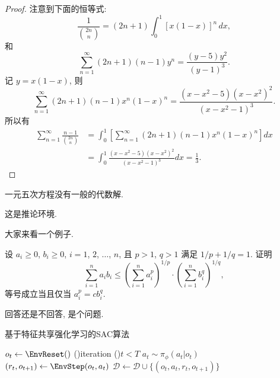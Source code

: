 \begin{proof}
注意到下面的恒等式:
\[
\frac{1}{\binom{2n}{n}}=(2n+1)\int_0^1[x(1-x)]^n\,dx,
\]
和
\[
\sum_{n=1}^{\infty}(2n+1)(n-1)y^n=\frac{(y-5)y^2}{(y-1)^3}.
\]
记 $y=x(1-x)$, 则
\[
\sum_{n=1}^{\infty}(2n+1)(n-1)x^n(1-x)^n=\frac{(x-x^2-5)(x-x^2)^2}{(x-x^2-1)^3}.
\]
所以有
\begin{align*}
\sum_{n=1}^{\infty}\frac{n-1}{\binom{2n}{n}} & =
\int_0^1\left[\sum_{n=1}^{\infty}(2n+1)(n-1)x^n(1-x)^n\right]dx\\
& =\int_0^1\frac{(x-x^2-5)(x-x^2)^2}{(x-x^2-1)^3}dx=\frac13.
\end{align*}
\end{proof}

\begin{theorem}\label{the:theorem1}
一元五次方程没有一般的代数解.
\end{theorem}

\begin{corollary}
这是推论环境.
\end{corollary}

\begin{example}
大家来看一个例子.
\end{example}

\begin{exercise}
设 $a_i\geq0$, $b_i\geq0$, $i=1$, $2$, $\ldots$, $n$, 
且 $p>1$, $q>1$ 满足 $1/p+1/q=1$. 证明
\[
\sum_{i=1}^{n}a_ib_i\leq\left(\sum_{i=1}^{n}a_i^p\right)^{1/p}
\cdot\left(\sum_{i=1}^{n}b_i^q\right)^{1/q},
\]
等号成立当且仅当 $a_i^p=cb_i^q$.
\end{exercise}

\begin{problem}
回答还是不回答, 是个问题. 
\end{problem}

\begin{algorithm}[!htbp]
  \caption{基于特征共享强化学习的SAC算法}
  \label{algo:algo1}
  \DontPrintSemicolon
  \vspace{5pt}

  \Output{$\phi$}
  \BlankLine

  $o_t \leftarrow \EnvReset()$\;
  \Forever(){iteration}{
    \While(){$t<T$}{
      $a_t\sim \pi_\phi(a_t|o_t)$ 
      $(r_t,o_{t+1}) \leftarrow \EnvStep(o_t,a_t)$ 
      $\mathcal{D} \leftarrow \mathcal{D} \cup \{(o_t,a_t,r_t,o_{t+1})\}$ 
    }
  }
\end{algorithm}
